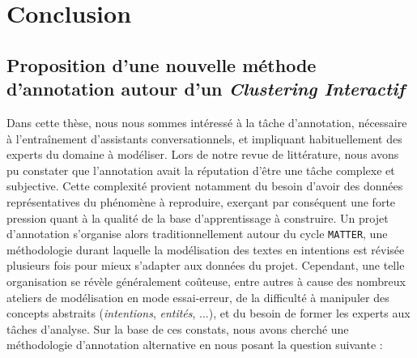 \chapter{Conclusion}
\label{chapter:6-CONCLUSION}
	
	\section*{Proposition d'une nouvelle méthode d'annotation autour d'un \textit{Clustering Interactif}}
	
		Dans cette thèse, nous nous sommes intéressé à la tâche d'annotation, nécessaire à l'entraînement d'assistants conversationnels, et impliquant habituellement des experts du domaine à modéliser.
		Lors de notre revue de littérature, nous avons pu constater que l'annotation avait la réputation d'être une tâche complexe et subjective.
		Cette complexité provient notamment du besoin d'avoir des données représentatives du phénomène à reproduire, exerçant par conséquent une forte pression quant à la qualité de la base d'apprentissage à construire.
		Un projet d'annotation s'organise alors traditionnellement autour du cycle \texttt{MATTER}, une méthodologie durant laquelle la modélisation des textes en intentions est révisée plusieurs fois pour mieux s'adapter aux données du projet.
		Cependant, une telle organisation se révèle généralement coûteuse, entre autres à cause des nombreux ateliers de modélisation en mode essai-erreur, de la difficulté à manipuler des concepts abstraits (\textit{intentions}, \textit{entités}, ...), et du besoin de former les experts aux tâches d'analyse.
		Sur la base de ces constats, nous avons cherché une méthodologie d'annotation alternative en nous posant la question suivante : 
		

